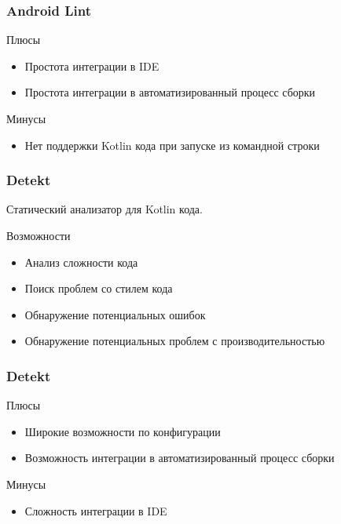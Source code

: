 \documentclass{beamer}
\begin{document}
\begin{frame}
    \frametitle{Android Lint}
    \begin{block}{Плюсы}
        \begin{itemize}
            \item{Простота интеграции в IDE}
            \item{Простота интеграции в автоматизированный процесс сборки}
        \end{itemize}
    \end{block}
    \begin{block}{Минусы}
        \begin{itemize}
            \item{Нет поддержки Kotlin кода при запуске из командной строки}
        \end{itemize}
    \end{block}
\end{frame}

\begin{frame}
    \frametitle{Detekt}
    Статический анализатор для Kotlin кода.
    \begin{block}{Возможности}
        \begin{itemize}
            \item{Анализ сложности кода}
            \item{Поиск проблем со стилем кода}
            \item{Обнаружение потенциальных ошибок}
            \item{Обнаружение потенциальных проблем с производительностью}
        \end{itemize}
    \end{block}
\end{frame}

\begin{frame}
    \frametitle{Detekt}
    \begin{block}{Плюсы}
        \begin{itemize}
            \item{Широкие возможности по конфигурации}
            \item{Возможность интеграции в автоматизированный процесс сборки}
        \end{itemize}
    \end{block}
    \begin{block}{Минусы}
        \begin{itemize}
            \item{Сложность интеграции в IDE}
        \end{itemize}
    \end{block}
\end{frame}
\end{document}
